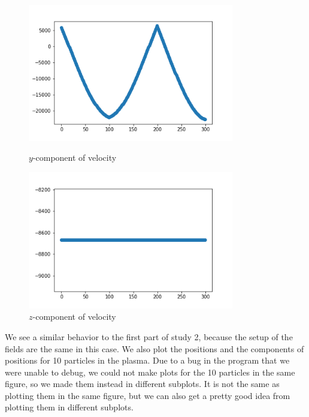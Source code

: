 \documentclass[12pt]{article}
\begin{document}
	\begin{figure}[H]
		\begin{multicols}{2}
			\includegraphics[width=\linewidth, height=6cm]{vsy3Bz.png} \caption{$y$-component of velocity} \label{vsy3Bz} \par
			\includegraphics[width=\linewidth, height=6cm]{vsz3Bz.png} \caption{$z$-component of velocity} \label{vsz3Bz} \par
		\end{multicols}
	\end{figure}
	\noindent We see a similar behavior to the first part of study 2, because the setup of the fields are the same in this case. We also plot the positions and the components of positions for 10 particles in the plasma. Due to a bug in the program that we were unable to debug, we could not make plots for the 10 particles in the same figure, so we made them instead in different subplots. It is not the same as plotting them in the same figure, but we can also get a pretty good idea from plotting them in different subplots.
\end{document}
